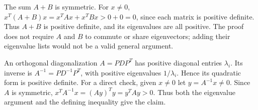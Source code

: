 The sum $A+B$ is symmetric. For $x\ne0$,
$x^T(A+B)x=x^TAx+x^TBx>0+0=0$, since each matrix is positive definite.
Thus $A+B$ is positive definite, and its eigenvalues are all positive.
The proof does not require $A$ and $B$ to commute or share eigenvectors;
adding their eigenvalue lists would not be a valid general argument.

An orthogonal diagonalization $A=PDP^T$ has positive diagonal entries
$\lambda_i$. Its inverse is $A^{-1}=PD^{-1}P^T$, with positive eigenvalues
$1/\lambda_i$. Hence its quadratic form is positive definite.
For a direct check, given $x\ne0$ let $y=A^{-1}x\ne0$. Since $A$ is
symmetric, $x^TA^{-1}x=(Ay)^Ty=y^TAy>0$.
Thus both the eigenvalue argument and the defining inequality give the claim.

